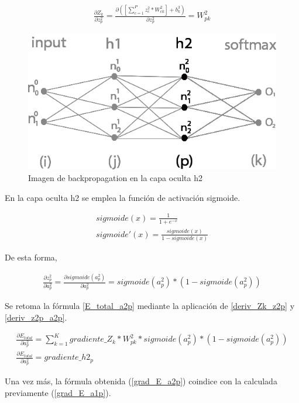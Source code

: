 \begin{gather}
	\frac{\partial Z_k}{\partial z^2_p} = \frac{\partial( [\sum_{c=1}^{P} z^2_c * W^2_{ck}] + b^3_k)}{\partial z^2_p} = W^2_{pk}
	\label{deriv_Zk_z2p}
\end{gather}

\begin{figure}[H]
	\centering
	\includegraphics[scale=0.35]{imagenes/nn_2_capa_h2.jpg}  
	\caption{Imagen de backpropagation en la capa oculta h2}
	\label{fig:nn_2_capa_h2}
\end{figure}

En la capa oculta h2 se emplea la función de activación sigmoide. 

\begin{gather}
	sigmoide(x) = \frac{1}{1+e^{-x}} \\
	sigmoide'(x) = \frac{sigmoide(x)}{1-sigmoide(x)}
\end{gather}

De esta forma,


\begin{gather}
	\frac{\partial z^2_ p}{\partial a^2_p} = \frac{\partial sigmoide(a^2_p)}{\partial a^2_p} = sigmoide(a^2_p)*(1-sigmoide(a^2_p))
	\label{deriv_z2p_a2p}
\end{gather}

Se retoma la fórmula \ref{E_total_a2p} mediante la aplicación de \ref{deriv_Zk_z2p} y \ref{deriv_z2p_a2p}.

\begin{gather}
	\frac{\partial E_{total}}{\partial a^2_p} = \sum_{k=1}^K  gradiente\_Z_k * W^2_{pk} * sigmoide(a^2_p)*(1-sigmoide(a^2_p)) \\
	\frac{\partial E_{total}}{\partial a^2_p} = gradiente\_h2_p
	\label{grad_E_a2p}
\end{gather}

Una vez más, la fórmula obtenida (\ref{grad_E_a2p}) coindice con la calculada previamente (\ref{grad_E_a1p}). \\

